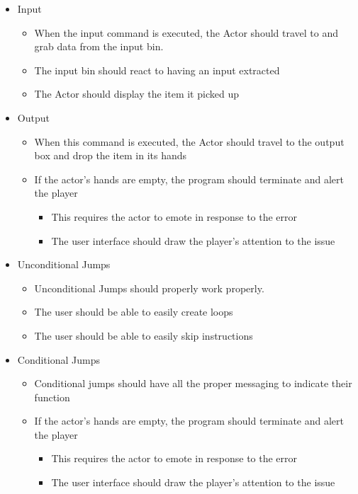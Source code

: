 \begin{itemize}
  \item Input
  \begin{itemize}
    \item When the input command is executed, the Actor should travel to and
    grab data from the input bin.
    \item The input bin should react to having an input extracted
    \item The Actor should display the item it picked up
  \end{itemize}
  \item Output
  \begin{itemize}
    \item When this command is executed, the Actor should travel to the output box
    and drop the item in its hands
    \item If the actor’s hands are empty, the program should terminate and alert
    the player
    \begin{itemize}
      \item This requires the actor to emote in response to the error
      \item The user interface should draw the player’s attention to the issue
    \end{itemize}
  \end{itemize}
  \item Unconditional Jumps
  \begin{itemize}
    \item Unconditional Jumps should properly work properly.
    \item The user should be able to easily create loops
    \item The user should be able to easily skip instructions
  \end{itemize}
  \item Conditional Jumps
  \begin{itemize}
    \item Conditional jumps should have all the proper messaging to indicate
    their function
    \item If the actor’s hands are empty, the program should terminate and alert
    the player
    \begin{itemize}
      \item This requires the actor to emote in response to the error
      \item The user interface should draw the player’s attention to the issue
    \end{itemize}

\end{itemize}
\end{itemize}
